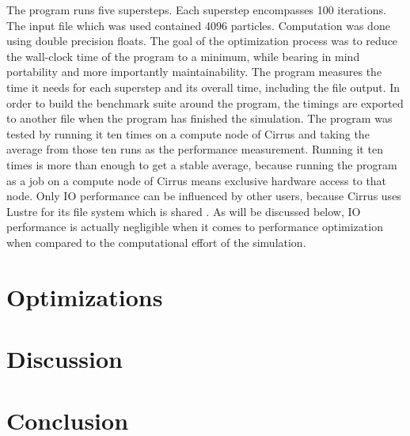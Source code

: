 \documentclass[twoside,11pt]{article}
\begin{document}
The program runs five supersteps.
Each superstep encompasses 100 iterations.
The input file which was used contained 4096 particles.
Computation was done using double precision floats.
The goal of the optimization process was to reduce the wall-clock
time of the program to a minimum, while bearing in mind portability
and more importantly maintainability.
The program measures the time it needs for each superstep and its
overall time, including the file output.
In order to build the benchmark suite around the program, the timings
are exported to another file when the program has finished the
simulation.
The program was tested by running it ten times on a compute node of
Cirrus and taking the average from those ten runs as the performance
measurement.
Running it ten times is more than enough to get a stable average,
because running the program as a job on a compute node of Cirrus
means exclusive hardware access to that node.
Only IO performance can be influenced by other users, because Cirrus
uses Lustre for its file system which is shared
\citep{cirrus_hardware}.
As will be discussed below, IO performance is actually negligible when
it comes to performance optimization when compared to the
computational effort of the simulation.


\section{Optimizations} %
\label{sec:opt}


\section{Discussion} %
\label{sec:dis}


\section{Conclusion} %
\label{sec:con}



\end{document}

